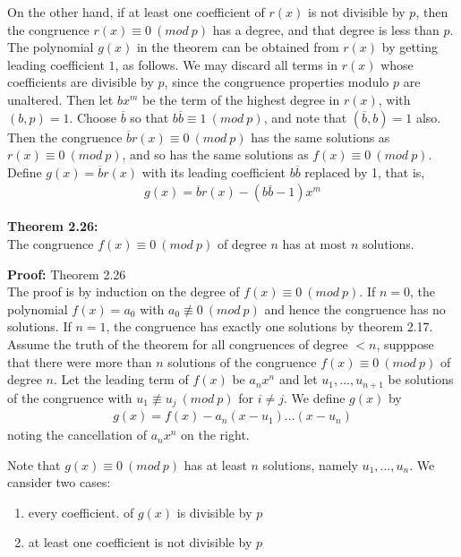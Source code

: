 \documentclass[a4paper]{article}
\begin{document}
On the other hand, if at least one coefficient of $r(x)$ is not divisible by
$p$, then the congruence $r(x)\equiv 0\ (mod\ p)$ has a degree, and that degree
is  less than $p$. The polynomial $g(x)$ in the theorem can be obtained from
$r(x)$ by getting leading coefficient $1$, as follows. We may discard all terms
in $r(x)$ whose coefficients are divisible by $p$, since the congruence
properties modulo $p$ are unaltered. Then let $bx^m$ be the term of the highest
degree in $r(x)$, with $(b,p)=1$. Choose $\overline{b}$ so that
$b\overline{b}\equiv 1\ (mod\ p)$, and note that $(\overline{b},b)=1$ also. Then
the congruence $\overline{b}r(x)\equiv 0\ (mod\ p)$ has the same solutions as
$r(x)\equiv 0\ (mod\ p)$, and so has the same solutions as $f(x)\equiv 0\ (mod\ p)$.
Define $g(x)=\overline{b}r(x)$ with its leading coefficient $b\overline{b}$
replaced by 1, that is,
\begin{align}
    g(x)=\overline{b}r(x)-(b\overline{b}-1)x^m
\end{align}

\textbf{Theorem 2.26:}\\
The congruence $f(x)\equiv 0\ (mod\ p)$ of degree $n$ has at most $n$ solutions.

\textbf{Proof:} Theorem 2.26\\
The proof is by induction on the degree of $f(x)\equiv 0\ (mod\ p)$.
If $n=0$, the polynomial $f(x)=a_0$ with $a_0\not\equiv 0\ (mod\ p)$ and hence
the congruence has no solutions. If $n=1$, the congruence has exactly one
solutions by theorem 2.17.
Assume the truth of the theorem for all congruences of degree $<n$, supppose that
there were more than $n$ solutions of the congruence $f(x)\equiv 0\ (mod\ p)$ of
degree $n$. Let the leading term of $f(x)$ be $a_nx^n$ and let $u_1,...,u_{n+1}$
be solutions of the congruence with $u_1\not\equiv u_j\ (mod\ p)$ for $i\neq j$.
We define $g(x)$ by
\begin{align}
    g(x)=f(x)-a_n(x-u_1)...(x-u_n)
\end{align}
noting the cancellation of $a_nx^n$ on the right.

Note that $g(x)\equiv 0\ (mod\ p)$ has at least $n$ solutions, namely $u_1,...,u_n$.
We cansider two cases:

\renewcommand{\theenumi}{\roman{enumi}}
\begin{enumerate}
    \item every coefficient. of $g(x)$ is divisible by $p$
    \item at least one coefficient is not divisible by $p$
\end{enumerate}
\end{document}
